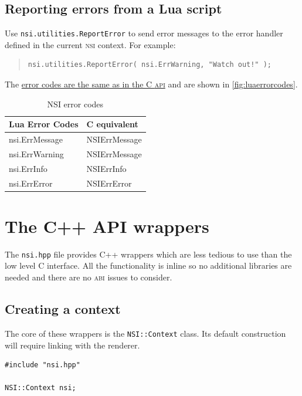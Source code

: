 \documentclass[oneside,ebook]{memoir}
\newcommand*{\acronym}[1]{\textsc{\lowercase{#1}}}
\begin{document}
\subsection{Reporting errors from a Lua script}
\label{subsection:luaerrors}
Use \lstinline|nsi.utilities.ReportError| to send error messages to the error handler defined in the current \acronym{NSI} context. For example:
\begin{quote}
\begin{lstlisting}
nsi.utilities.ReportError( nsi.ErrWarning, "Watch out!" );
\end{lstlisting}
\end{quote}
The \hyperref[subsection:errors]{error codes are the same as in the C \acronym{API}} and are shown in \autoref{fig:luaerrorcodes}.

\begin{table}[ht]
	\centering
	\begin{tabular}[c]{ll} \toprule
	\textbf{Lua Error Codes} & \textbf{C equivalent} \\ \midrule
	nsi.ErrMessage & NSIErrMessage \\
	nsi.ErrWarning & NSIErrMessage \\
	nsi.ErrInfo & NSIErrInfo \\
	nsi.ErrError & NSIErrError \\ \bottomrule
	\end{tabular}
	\caption{NSI error codes}\label{fig:luaerrorcodes}
\end{table}

\section{The C++ API wrappers}
The \lstinline|nsi.hpp| file provides \textsc{C++} wrappers which are less tedious to use than the low level \textsc{C} interface. All the functionality is inline so no additional libraries are needed and there are no \acronym{ABI} issues to consider.

\subsection{Creating a context}
The core of these wrappers is the \lstinline|NSI::Context| class. Its default construction will require linking with the renderer.
\begin{lstlisting}
#include "nsi.hpp"

NSI::Context nsi;
\end{lstlisting}
\end{document}
